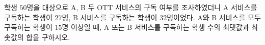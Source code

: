 학생 $50$명을 대상으로 A, B 두 OTT 서비스의 구독 여부를 조사하였더니 A 서비스를 구독하는 학생이 $27$명, B 서비스를 구독하는 학생이 $32$명이었다. A와 B 서비스를 모두 구독하는 학생이 $15$명 이상일 때, A 또는 B 서비스를 구독하는 학생 수의 최댓값과 최솟값의 합을 구하시오.

